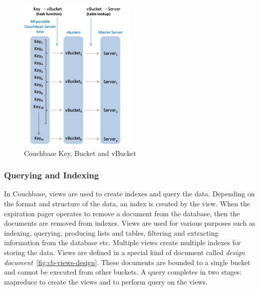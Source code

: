 \begin{figure}[h]
	\centering
	\includegraphics[width=0.5\textwidth]{img/vbucket2}
	\caption{ Couchbase Key, Bucket and   vBucket ~\cite{couchbasedocs}}
	\label{fig:cb-vbucket}
\end{figure}




\subsubsection{Querying and Indexing}

 In Couchbase, views are used to create indexes and query the data. Depending on the format and structure of the data, an index is created by the view. When the expiration pager operates to remove a document from the database, then the documents are removed from indexes. Views are used for various purposes such as indexing, querying, producing lists and tables, filtering and extracting information from the database etc. Multiple views create multiple indexes for storing the data. Views are defined in a special kind of document called \textit{design document}~\ref{fig:cb-views-design}. These documents are bounded to a single bucket and cannot be executed from other buckets. A query completes in two stages: mapreduce to create the views and to perform query on the views.
 
